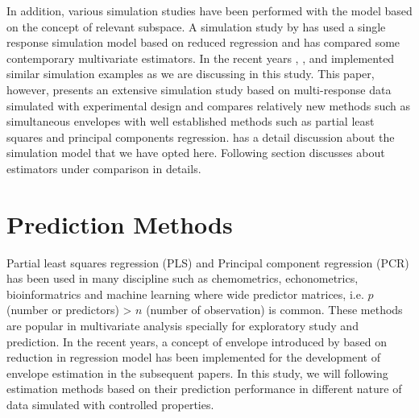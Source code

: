 \documentclass[12pt,3p,authoryear]{elsarticle}
\theoremstyle{definition}
\theoremstyle{definition}
\theoremstyle{definition}
\theoremstyle{remark}
\begin{document}
In addition, various simulation studies have been performed with the
model based on the concept of relevant subspace. A simulation study by
\citet{Alm_y_1996} has used a single response simulation model based on
reduced regression and has compared some contemporary multivariate
estimators. In the recent years \citet{helland2012near},
\citet{saebo2015simrel}, \citet{helland2016algorithms} and
\citet{Rimal2018} implemented similar simulation examples as we are
discussing in this study. This paper, however, presents an extensive
simulation study based on multi-response data simulated with
experimental design and compares relatively new methods such as
simultaneous envelopes with well established methods such as partial
least squares and principal components regression. \citet{Rimal2018} has
a detail discussion about the simulation model that we have opted here.
Following section discusses about estimators under comparison in
details.

\section{Prediction Methods}\label{prediction-methods}

Partial least squares regression (PLS) and Principal component
regression (PCR) has been used in many discipline such as chemometrics,
echonometrics, bioinformatrics and machine learning where wide predictor
matrices, i.e. \(p\) (number or predictors) \textgreater{} \(n\) (number
of observation) is common. These methods are popular in multivariate
analysis specially for exploratory study and prediction. In the recent
years, a concept of envelope introduced by \citet{Cook2007a} based on
reduction in regression model has been implemented for the development
of envelope estimation in the subsequent papers. In this study, we will
following estimation methods based on their prediction performance in
different nature of data simulated with controlled properties.
\end{document}
